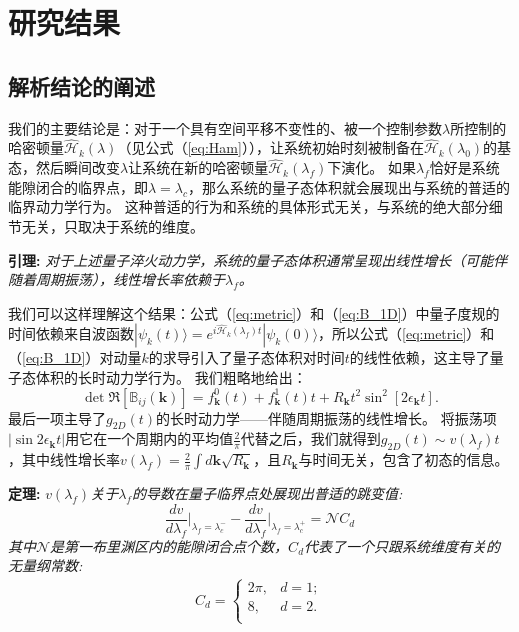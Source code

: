 	\section{研究结果}
	
		\subsection{解析结论的阐述}

			我们的主要结论是：对于一个具有空间平移不变性的、被一个控制参数$\lambda$所控制的哈密顿量$\hat{\mathcal{H}}_k(\lambda)$（见公式（\eqref{eq:Ham}）），让系统初始时刻被制备在$\hat{\mathcal{H}}_k(\lambda_0)$的基态，然后瞬间改变$\lambda$让系统在新的哈密顿量$\hat{\mathcal{H}}_k(\lambda_f)$下演化。
			如果$\lambda_f$恰好是系统能隙闭合的临界点，即$\lambda=\lambda_c$，那么系统的量子态体积就会展现出与系统的普适的临界动力学行为。
			这种普适的行为和系统的具体形式无关，与系统的绝大部分细节无关，只取决于系统的维度。
			
			{\bf 引理:}
			\textit{对于上述量子淬火动力学，系统的量子态体积通常呈现出线性增长（可能伴随着周期振荡），线性增长率依赖于$\lambda_f$。}
			
			我们可以这样理解这个结果：公式（\ref{eq:metric}）和（\ref{eq:B_1D}）中量子度规的时间依赖来自波函数$|\psi_k(t)\rangle=e^{i\hat{\mathcal{H}}_k(\lambda_f)t}|\psi_k(0)\rangle$，所以公式（\ref{eq:metric}）和（\ref{eq:B_1D}）对动量$k$的求导引入了量子态体积对时间$t$的线性依赖，这主导了量子态体积的长时动力学行为。
			我们粗略地给出：
			\begin{equation}
				\det{\Re[\mathbb{B}_{ij}(\mathbf{k})]} = f_\mathbf{k}^0(t)+f_\mathbf{k}^1(t) t+R_\mathbf{k} t^2\sin^2[2 \epsilon_\mathbf{k} t]. \label{eq:Rk}
			\end{equation}
			最后一项主导了$g_{2D}(t)$的长时动力学——伴随周期振荡的线性增长。
			将振荡项$|\sin2\epsilon_{\mathbf{k}}t|$用它在一个周期内的平均值$\frac 2\pi$代替之后，我们就得到$g_{2D}(t)\sim v(\lambda_f)t$，其中线性增长率$v(\lambda_f)=\frac 2\pi\int d\mathbf{k}\sqrt{R_{\mathbf{k}}}$，且$R_{\mathbf{k}}$与时间无关，包含了初态的信息。
			
			{\bf 定理:}
			\textit{$v(\lambda_f)$关于$\lambda_f$的导数在量子临界点处展现出普适的跳变值:
				\begin{equation}\label{eq:Cd}
					\frac{dv}{d\lambda_f}\bigg |_{\lambda_f=\lambda_c^-} - \frac{dv}{d\lambda_f}\bigg |_{\lambda_f=\lambda_c^+} = \mathcal{N} C_d
				\end{equation}
				其中$\mathcal{N}$是第一布里渊区内的能隙闭合点个数，$C_d$代表了一个只跟系统维度有关的无量纲常数:
				\begin{eqnarray}
					C_d = \left\{\begin{array}{cl}
						2\pi, & d=1;   \\
						8, & d=2. \\
					\end{array}\right.
				\end{eqnarray}
			}
		
